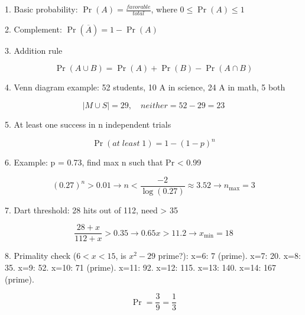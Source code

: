 1. Basic probability: $\Pr(A) = \frac{favorable}{total}$, where $0 \le \Pr(A) \le 1$

2. Complement: $\Pr(\overline{A}) = 1 - \Pr(A)$

3. Addition rule

$$ \Pr(A \cup B) = \Pr(A) + \Pr(B) - \Pr(A \cap B) $$

4. Venn diagram example: 52 students, 10 A in science, 24 A in math, 5 both

$$ |M \cup S| = 29, \quad neither = 52-29 = 23 $$

5. At least one success in n independent trials

$$ \Pr(at \; least \; 1) = 1-(1-p)^n $$

6. Example: p = 0.73, find max n such that Pr < 0.99

$$ (0.27)^n > 0.01 \rightarrow n < \frac{-2}{\log(0.27)} \approx 3.52 \rightarrow n_{\max} = 3 $$

7. Dart threshold: 28 hits out of 112, need > 35%

$$ \frac{28+x}{112+x} > 0.35 \rightarrow 0.65x > 11.2 \rightarrow x_{\min} = 18 $$

8. Primality check ($6 < x < 15$, is $x^2 - 29$ prime?):
x=6: 7 (prime). x=7: 20. x=8: 35. x=9: 52. x=10: 71 (prime). x=11: 92. x=12: 115. x=13: 140. x=14: 167 (prime).

$$ \Pr = \frac{3}{9} = \frac{1}{3} $$
